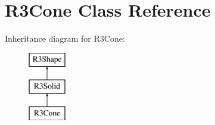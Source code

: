 \hypertarget{class_r3_cone}{}\section{R3\+Cone Class Reference}
\label{class_r3_cone}
Inheritance diagram for R3\+Cone\+:\begin{figure}[H]
\begin{center}
\leavevmode
\includegraphics[height=3.000000cm]{class_r3_cone}
\end{center}
\end{figure}
